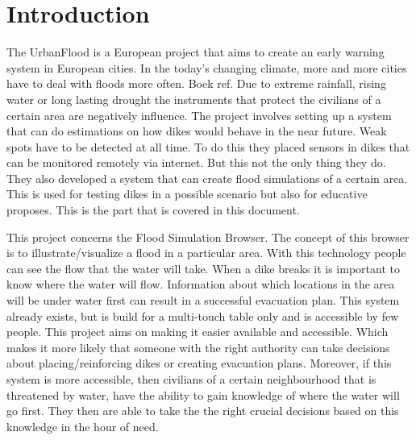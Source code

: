 
\section{Introduction}
The UrbanFlood is a European project that aims to create an early warning system in European cities. In the today's changing climate, more and more cities have to deal with floods more often. Boek ref. Due to extreme rainfall, rising water or long lasting drought the instruments that protect the civilians of a certain area are negatively influence. The project involves setting up a system that can do estimations on how dikes would behave in the near future. Weak spots have to be detected at all time. To do this they placed sensors in dikes that can be monitored remotely via internet. But this not the only thing they do. They also developed a system that can create flood simulations of a certain area. This is used for testing dikes in a possible scenario but also for educative proposes. This is the part that is covered in this document.

This project concerns the Flood Simulation Browser. The concept of this browser is to illustrate/visualize a flood in a particular area. With this technology people can see the flow that the water will take. When a dike breaks it is important to know where the water will flow. Information about which locations in the area will be under water first can result in a successful evacuation plan. This system already exists, but is build for a multi-touch table only and is accessible by few people. This project aims on making it easier available and accessible. Which makes it more likely that someone with the right authority can take decisions about placing/reinforcing dikes or creating evacuation plans. Moreover, if this system is more accessible, then civilians of a certain neighbourhood that is threatened by water, have the ability to gain knowledge of where the water will go first. They then are able to take the the right crucial decisions based on this knowledge in the hour of need.

